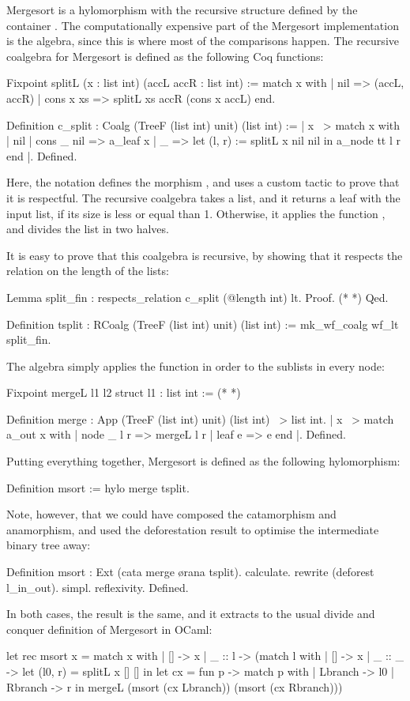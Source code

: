 \documentclass[anonymous, a4paper, UKenglish, cleveref, autoref, thm-restate]{lipics-v2021}
\begin{document}
Mergesort is a hylomorphism with the recursive structure defined by the
container . 
The computationally expensive part of the Mergesort implementation is the
algebra, since this is where most of the comparisons happen. The recursive
coalgebra for Mergesort is defined as the following Coq functions:
\begin{coqcode}
Fixpoint splitL (x : list int) (accL accR : list int) :=
  match x with
  | nil => (accL, accR)
  | cons x xs => splitL xs accR (cons x accL)
  end.

Definition c_split : Coalg (TreeF (list int) unit) (list int) :=
|{ x ~> match x with
        | nil | cons _ nil => a_leaf x
        | _ => let (l, r) := splitL x nil nil in
               a_node tt l r
        end
 }|.
Defined.
\end{coqcode}
Here, the notation  defines the morphism ,
and uses a custom tactic to prove that it is respectful. The recursive
coalgebra  takes a list, and it returns a leaf with the input
list, if its size is less or equal than 1. Otherwise, it applies the function
, and divides the list in two halves.

It is easy to prove that this coalgebra is recursive, by showing that
it respects the relation \coq{<} on the length of the lists:
\begin{coqcode}
Lemma split_fin : respects_relation c_split (@length int) lt.
  Proof. (* *) Qed.

Definition tsplit : RCoalg (TreeF (list int) unit) (list int)
  := mk_wf_coalg wf_lt split_fin.
\end{coqcode}

The algebra simply applies the  function in order to the sublists
in every node:
\begin{coqcode}
Fixpoint mergeL l1 l2 {struct l1}  : list int := (* *)

Definition merge : App (TreeF (list int) unit) (list int) ~> list int.
|{ x ~> match a_out x with | node _ l r => mergeL l r | leaf e => e end }|.
Defined.
\end{coqcode}

Putting everything together, Mergesort is defined as the following
hylomorphism:
\begin{coqcode}
Definition msort := hylo merge tsplit.
\end{coqcode}
Note, however, that we could have composed the catamorphism and anamorphism,
and used the deforestation result to optimise the intermediate binary tree
away:
\begin{coqcode}
Definition msort : Ext (cata merge \o rana tsplit).
calculate. rewrite (deforest l_in_out). simpl. reflexivity. Defined.
\end{coqcode}
In both cases, the result is the same, and it extracts to the usual divide and
conquer definition of Mergesort in OCaml:
\begin{ocamlcode}
let rec msort x = match x with
| [] -> x | _ :: l -> (match l with | [] -> x | _ :: _ ->
     let (l0, r) = splitL x [] [] in
     let cx = fun p -> match p with | Lbranch -> l0 | Rbranch -> r in
     mergeL (msort (cx Lbranch)) (msort (cx Rbranch)))
\end{ocamlcode}
\end{document}
